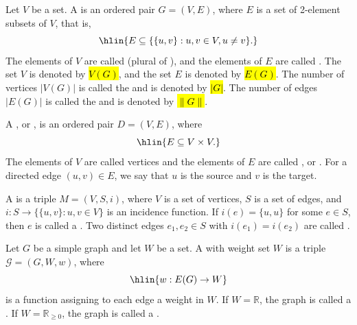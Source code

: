 \begin{definition} \label{definition:simple_graph_directed_graph_multigraph_weighted_graph}
Let $V$ be a set. A  is an ordered pair $G = (V, E)$, where $E$ is a set of 2-element subsets of $V$, that is,
$$\hlin{E \subseteq \{\{u,v\} : u,v \in V, u \neq v\}.}$$
The elements of $V$ are called  (plural of ), and the elements of $E$ are called . The set $V$ is denoted by \hl{$V(G)$}, and the set $E$ is denoted by \hl{$E(G)$}. The number of vertices $|V(G)|$ is called the  and is denoted by \hl{$|G|$}. The number of edges $|E(G)|$ is called the  and is denoted by \hl{$\|G\|$}.

A , or , is an ordered pair $D = (V, E)$, where
$$\hlin{E \subseteq V \times V.}$$
The elements of $V$ are called vertices and the elements of $E$ are called , or . For a directed edge $(u,v) \in E$, we say that $u$ is the source and $v$ is the target.

A  is a triple $M = (V, S, i)$, where $V$ is a set of vertices, $S$ is a set of edges, and $i: S \to \{\{u,v\} : u,v \in V\}$ is an incidence function. If $i(e) = \{u,u\}$ for some $e \in S$, then $e$ is called a . Two distinct edges $e_1, e_2 \in S$ with $i(e_1) = i(e_2)$ are called .

Let $G$ be a simple graph and let $W$ be a set. A  with weight set $W$ is a triple $\mathcal{G} = (G, W, w)$, where
$$\hlin{w: E(G) \to W}$$
is a function assigning to each edge a weight in $W$. If $W = \mathbb{R}$, the graph is called a . If $W = \mathbb{R}_{\geq 0}$, the graph is called a .
\end{definition}
